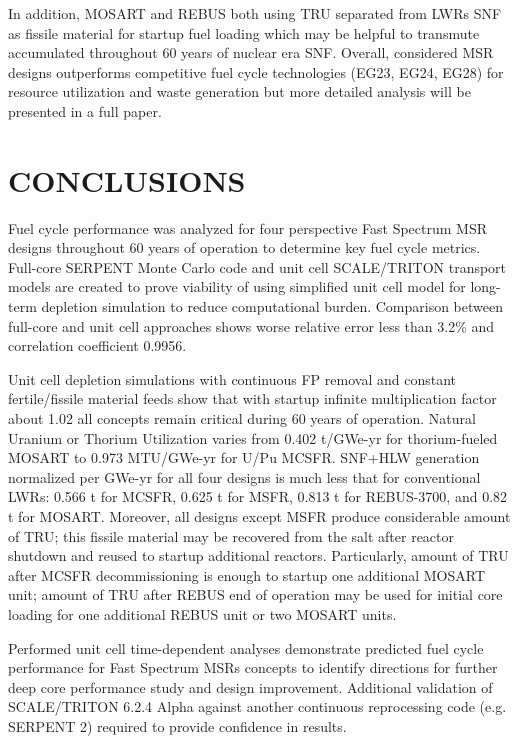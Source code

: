 \documentclass{anstrans}
\begin{document}
In addition, \gls{MOSART} and REBUS both using \gls{TRU} separated from \glspl{LWR} \gls{SNF} as fissile material for startup fuel loading which may be helpful to transmute accumulated throughout 60 years of nuclear era \gls{SNF}. Overall, considered \gls{MSR} designs outperforms competitive fuel cycle technologies (EG23, EG24, EG28) for resource utilization and waste generation but more detailed analysis will be presented in a full paper.
\section{CONCLUSIONS}
Fuel cycle performance was analyzed for four perspective Fast Spectrum \gls{MSR} designs throughout 60 years of operation to determine key fuel cycle metrics. Full-core SERPENT Monte Carlo code and unit cell SCALE/TRITON transport models are created to prove viability of using simplified unit cell model for long-term depletion simulation to reduce computational burden. Comparison between full-core and unit cell approaches shows worse relative error less than 3.2\% and  correlation coefficient 0.9956.

Unit cell depletion simulations with continuous \gls{FP} removal and constant fertile/fissile material feeds show that with startup infinite multiplication factor about 1.02 all concepts remain critical during 60 years of operation. Natural Uranium or Thorium Utilization varies from 0.402 t/GWe-yr for thorium-fueled \gls{MOSART} to 0.973 MTU/GWe-yr for U/Pu \gls{MCSFR}. \gls{SNF}+\gls{HLW} generation normalized per GWe-yr for all four designs is much less that for conventional \glspl{LWR}: 0.566 t for \gls{MCSFR}, 0.625 t for \gls{MSFR}, 0.813 t for REBUS-3700, and 0.82 t for \gls{MOSART}. Moreover, all designs except \gls{MSFR} produce considerable amount of \gls{TRU}; this fissile material may be recovered from the salt after reactor shutdown and reused to startup additional reactors. Particularly, amount of \gls{TRU} after \gls{MCSFR} decommissioning is enough to startup one additional \gls{MOSART} unit; amount of \gls{TRU} after REBUS end of operation may be used for initial core loading for one additional REBUS unit or two \gls{MOSART} units. 

Performed unit cell time-dependent analyses demonstrate predicted fuel cycle performance for Fast Spectrum \glspl{MSR} concepts to identify directions for further deep core performance study and design improvement. Additional validation of SCALE/TRITON 6.2.4 Alpha against another continuous reprocessing code (e.g. SERPENT 2) required to provide confidence in results.
\end{document}
